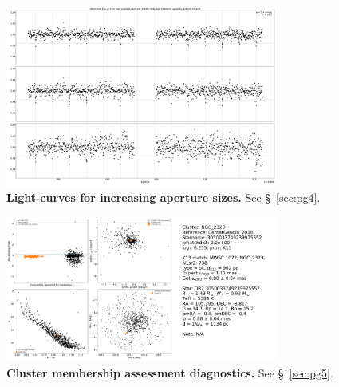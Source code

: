 \documentclass[12pt,twocolumn,tighten]{aastex62}
\begin{document}
\begin{figure}[!h]
	\begin{center}
		\leavevmode
		\includegraphics[width=0.8\textwidth]{pg_0004.pdf}
	\end{center}
	\vspace{-0.5cm}
	\caption{
		{\bf Light-curves for increasing aperture sizes.}  See
    \S~\ref{sec:pg4}.
		\label{fig:pg4}
	}
\end{figure}

\begin{figure}[!h]
	\begin{center}
		\leavevmode
		\includegraphics[width=0.8\textwidth]{pg_0005.pdf}
	\end{center}
	\vspace{-0.5cm}
	\caption{
    {\bf Cluster membership assessment diagnostics.} See
    \S~\ref{sec:pg5}.
		\label{fig:pg5}
	}
\end{figure}
\end{document}

